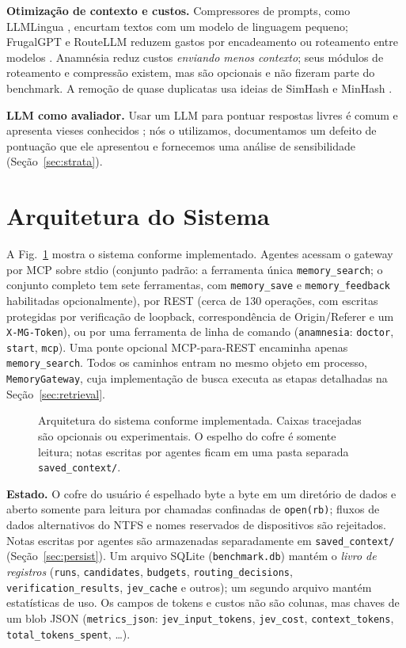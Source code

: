 \documentclass[conference,onecolumn,11pt]{IEEEtran}
\newcommand{\anam}{Anam\-n\'esia}
\begin{document}
\textbf{Otimização de contexto e custos.} Compressores de prompts, como LLMLingua \cite{jiang2023llmlingua,jiang2023longllmlingua}, encurtam textos com um modelo de linguagem pequeno; FrugalGPT e RouteLLM reduzem gastos por encadeamento ou roteamento entre modelos \cite{chen2023frugalgpt,ong2024routellm}. \anam{} reduz custos \emph{enviando menos contexto}; seus módulos de roteamento e compressão existem, mas são opcionais e não fizeram parte do benchmark. A remoção de quase duplicatas usa ideias de SimHash e MinHash \cite{charikar2002simhash,manku2007nearduplicates,broder1997resemblance}.

\textbf{LLM como avaliador.} Usar um LLM para pontuar respostas livres é comum e apresenta vieses conhecidos \cite{zheng2023judge}; nós o utilizamos, documentamos um defeito de pontuação que ele apresentou e fornecemos uma análise de sensibilidade (Seção~\ref{sec:strata}).

\section{Arquitetura do Sistema}\label{sec:arch}
A Fig.~\ref{fig:arch} mostra o sistema conforme implementado. Agentes acessam o gateway por MCP sobre stdio (conjunto padrão: a ferramenta única \texttt{memory\_search}; o conjunto completo tem sete ferramentas, com \texttt{memory\_save} e \texttt{memory\_feedback} habilitadas opcionalmente), por REST (cerca de 130 operações, com escritas protegidas por verificação de loopback, correspondência de Origin/Referer e um \texttt{X-MG-Token}), ou por uma ferramenta de linha de comando (\texttt{anamnesia}: \texttt{doctor}, \texttt{start}, \texttt{mcp}). Uma ponte opcional MCP-para-REST encaminha apenas \texttt{memory\_search}. Todos os caminhos entram no mesmo objeto em processo, \texttt{MemoryGateway}, cuja implementação de busca executa as etapas detalhadas na Seção~\ref{sec:retrieval}.

\begin{figure}[!htbp]\centering
{}
\caption{Arquitetura do sistema conforme implementada. Caixas tracejadas são opcionais ou experimentais. O espelho do cofre é somente leitura; notas escritas por agentes ficam em uma pasta separada \texttt{saved\_context/}.}\label{fig:arch}
\end{figure}

\textbf{Estado.} O cofre do usuário é espelhado byte a byte em um diretório de dados e aberto somente para leitura por chamadas confinadas de \texttt{open(rb)}; fluxos de dados alternativos do NTFS e nomes reservados de dispositivos são rejeitados. Notas escritas por agentes são armazenadas separadamente em \texttt{saved\_context/} (Seção~\ref{sec:persist}). Um arquivo SQLite (\texttt{benchmark.db}) mantém o \emph{livro de registros} (\texttt{runs}, \texttt{candidates}, \texttt{budgets}, \texttt{routing\_decisions}, \texttt{verification\_results}, \texttt{jev\_cache} e outros); um segundo arquivo mantém estatísticas de uso. Os campos de tokens e custos não são colunas, mas chaves de um blob JSON (\texttt{metrics\_json}: \texttt{jev\_input\_tokens}, \texttt{jev\_cost}, \texttt{context\_tokens}, \texttt{total\_tokens\_spent}, \dots).
\end{document}
